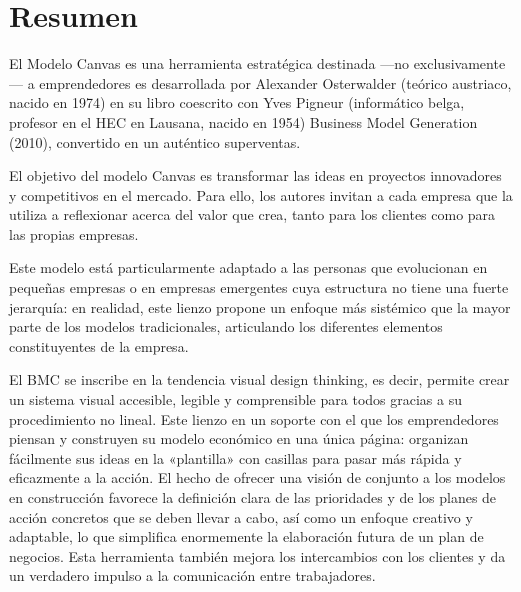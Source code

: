  \section{Resumen} 
El Modelo Canvas es una herramienta estratégica destinada —no exclusivamente— a emprendedores es desarrollada por Alexander Osterwalder (teórico austriaco, nacido en 1974) en su libro coescrito con Yves Pigneur (informático belga, profesor en el HEC en Lausana, nacido en 1954) Business Model Generation (2010), convertido en un auténtico superventas.

El objetivo del modelo Canvas es transformar las ideas en proyectos innovadores y competitivos en el mercado. Para ello, los autores invitan a cada empresa que la utiliza a reflexionar acerca del valor que crea, tanto para los clientes como para las propias empresas.

Este modelo está particularmente adaptado a las personas que evolucionan en pequeñas empresas o en empresas emergentes cuya estructura no tiene una fuerte jerarquía: en realidad, este lienzo propone un enfoque más sistémico que la mayor parte de los modelos tradicionales, articulando los diferentes elementos constituyentes de la empresa.


El BMC se inscribe en la tendencia visual  design thinking, es decir, permite crear un sistema visual accesible, legible y comprensible para todos gracias a su procedimiento no lineal. Este lienzo en un soporte con el que los emprendedores piensan y construyen su modelo económico en una única página: organizan fácilmente sus ideas en la «plantilla» con casillas para pasar más rápida y eficazmente a la acción. El hecho de ofrecer una visión de conjunto a los modelos en construcción favorece la definición clara de las prioridades y de los planes de acción concretos que se deben llevar a cabo, así como un enfoque creativo y adaptable, lo que simplifica enormemente la elaboración futura de un plan de negocios. Esta herramienta también mejora los intercambios con los clientes y da un verdadero impulso a la comunicación entre trabajadores.